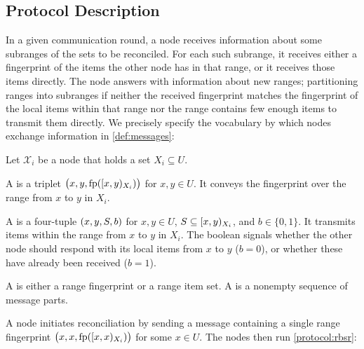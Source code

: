 \documentclass[conference]{IEEEtran}
\newcommand{\peer}[1]{\ensuremath{\mathcal{X}_{#1}}}
\begin{document}

\subsection{Protocol Description}

In a given communication round, a node receives information about some subranges of the sets to be reconciled. For each such subrange, it receives either a fingerprint of the items the other node has in that range, or it receives those items directly. The node answers with information about new ranges; partitioning ranges into subranges if neither the received fingerprint matches the fingerprint of the local items within that range nor the range contains few enough items to transmit them directly. We precisely specify the vocabulary by which nodes exchange information in \cref{def:messages}:

\begin{definition}
\label{def:messages}
Let \peer{i} be a node that holds a set $X_i \subseteq U$.

A  is a triplet $\bigl({x}, {y}, {\operatorname{fp}([{x},{y})_{X_i})}\bigr)$ for $x, y \in U$. It conveys the fingerprint over the range from $x$ to $y$ in $X_i$.

A  is a four-tuple $({x}, {y}, {S}, {b})$ for $x, y \in U$, $S \subseteq [{x},{y})_{X_i}$, and $b \in \{0, 1\}$. It transmits items within the range from $x$ to $y$ in $X_i$. The boolean signals whether the other node should respond with its local items from $x$ to $y$ ($b = 0$), or whether these have already been received ($b = 1$).
 
A  is either a range fingerprint or a range item set. A  is a nonempty sequence of message parts. 
\end{definition}

\theoremstyle{definition}
\newtheorem{protocol}{Protocol}

A node initiates reconciliation by sending a message containing a single range fingerprint $\bigl({x}, {x}, {\operatorname{fp}([{x},{x})_{X_i})}\bigr)$ for some $x \in U$. The nodes then run \cref{protocol:rbsr}:
\end{document}
